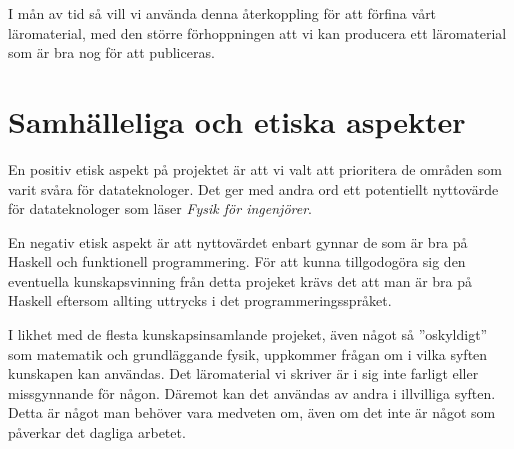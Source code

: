 \documentclass[12pt,a4paper]{article}
\begin{document}
I mån av tid så vill vi använda denna återkoppling för att förfina vårt läromaterial, med den större förhoppningen att vi kan producera ett läromaterial som är bra nog för att publiceras.

\section{Samhälleliga och etiska aspekter}

En positiv etisk aspekt på projektet är att vi valt att prioritera de områden som varit svåra för datateknologer. Det ger med andra ord ett potentiellt nyttovärde för datateknologer som läser \textit{Fysik för ingenjörer}.

En negativ etisk aspekt är att nyttovärdet enbart gynnar de som är bra på Haskell och funktionell programmering. För att kunna tillgodogöra sig den eventuella kunskapsvinning från detta projeket krävs det att man är bra på Haskell eftersom allting uttrycks i det programmeringsspråket.

I likhet med de flesta kunskapsinsamlande projeket, även något så ''oskyldigt'' som matematik och grundläggande fysik, uppkommer frågan om i vilka syften kunskapen kan användas. Det läromaterial vi skriver är i sig inte farligt eller missgynnande för någon. Däremot kan det användas av andra i illvilliga syften. Detta är något man behöver vara medveten om, även om det inte är något som påverkar det dagliga arbetet.

\end{document}
